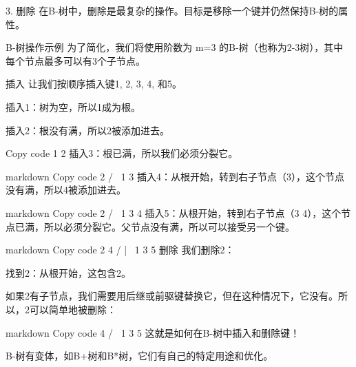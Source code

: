 3. 删除
在B-树中，删除是最复杂的操作。目标是移除一个键并仍然保持B-树的属性。

B-树操作示例
为了简化，我们将使用阶数为 m=3 的B-树（也称为2-3树），其中每个节点最多可以有3个子节点。

插入
让我们按顺序插入键1, 2, 3, 4, 和5。

插入1：树为空，所以1成为根。

插入2：根没有满，所以2被添加进去。

Copy code
 1 2
插入3：根已满，所以我们必须分裂它。

markdown
Copy code
     2
   /   \
 1       3
插入4：从根开始，转到右子节点（3），这个节点没有满，所以4被添加进去。

markdown
Copy code
     2
   /   \
 1      3 4
插入5：从根开始，转到右子节点（3 4），这个节点已满，所以必须分裂它。父节点没有满，所以可以接受另一个键。

markdown
Copy code
     2 4
   /   |   \
 1      3    5
删除
我们删除2：

找到2：从根开始，这包含2。

如果2有子节点，我们需要用后继或前驱键替换它，但在这种情况下，它没有。所以，2可以简单地被删除：

markdown
Copy code
     4
   /   \
 1      3 5
这就是如何在B-树中插入和删除键！


B-树有变体，如B+树和B*树，它们有自己的特定用途和优化。